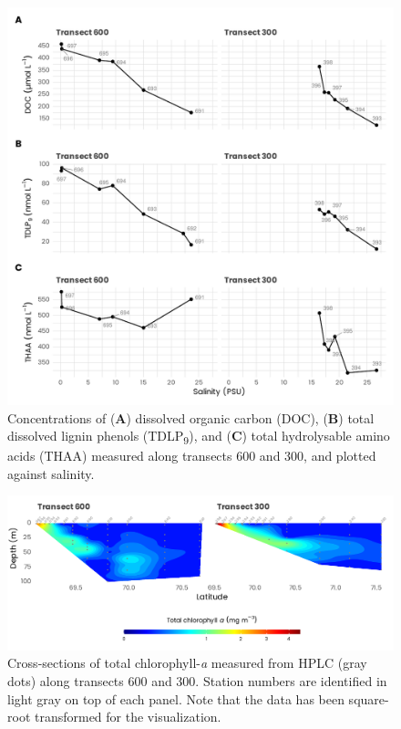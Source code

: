 \documentclass[essd, manuscript]{copernicus}
\begin{document}
\begin{figure}[H]
    \centering
    \includegraphics[scale = 1]{../../../graphs/fig08.pdf}
    \caption{Concentrations of (\textbf{A}) dissolved organic carbon (DOC), (\textbf{B}) total dissolved lignin phenols (TDLP\textsubscript{9}), and (\textbf{C}) total hydrolysable amino acids (THAA) measured along transects 600 and 300, and plotted against salinity.}
\end{figure}

\clearpage

\begin{figure}[H]
    \centering
    \includegraphics[scale = 1]{../../../graphs/fig09.pdf}
    \caption{Cross-sections of total chlorophyll-\textit{a} measured from HPLC (gray dots) along transects 600 and 300. Station numbers are identified in light gray on top of each panel. Note that the data has been square-root transformed for the visualization.}
\end{figure}
\end{document}
